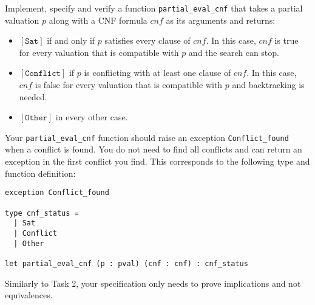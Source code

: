 \documentclass[11pt]{article}
\begin{document}
\begin{task}[10 pts] Implement, specify and verify a function \verb|partial_eval_cnf| 
that takes a partial valuation $p$ along with a CNF formula $cnf$ as
its arguments and returns:
\begin{itemize}
\setlength\itemsep{0em}
\item $[\texttt{Sat}]$ if and only if $p$ satisfies every clause of $cnf$.
In this case, $cnf$ is true for every valuation that is compatible
with $p$ and the search can stop.
\item $[\texttt{Conflict}]$ if $p$ is conflicting with at least one clause of $cnf$. In this case, $cnf$ is false for every valuation that is compatible with $p$ and backtracking is needed.
\item $[\texttt{Other}]$ in every other case.
\end{itemize}

Your \texttt{partial\_eval\_cnf} function should raise an exception \texttt{Conflict\_found} when a conflict is found. You do not need to find all conflicts and can return an exception in the first conflict you find.
%
This corresponds to the following type and function definition:
\begin{lstlisting}
exception Conflict_found

type cnf_status =
  | Sat
  | Conflict
  | Other

let partial_eval_cnf (p : pval) (cnf : cnf) : cnf_status
\end{lstlisting}

Similarly to Task 2, your specification only needs to prove implications and not equivalences.
\end{task}
\end{document}

